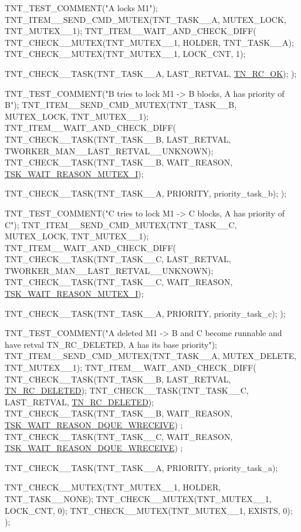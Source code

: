 \begin{DoxyCode}
TNT\_TEST\_COMMENT(\textcolor{stringliteral}{"A locks M1"});
TNT\_ITEM\_\_SEND\_CMD\_MUTEX(TNT\_TASK\_\_A, MUTEX\_LOCK, TNT\_MUTEX\_\_1);
TNT\_ITEM\_\_WAIT\_AND\_CHECK\_DIFF(
      TNT\_CHECK\_\_MUTEX(TNT\_MUTEX\_\_1, HOLDER, TNT\_TASK\_\_A);
      TNT\_CHECK\_\_MUTEX(TNT\_MUTEX\_\_1, LOCK\_CNT, 1);

      TNT\_CHECK\_\_TASK(TNT\_TASK\_\_A, LAST\_RETVAL, \hyperlink{tn__common_8h_aa43bd3da1ad4c1e61224b5f23b369876afb291924237186f5765865256c75e639}{TN\_RC\_OK});
      );

TNT\_TEST\_COMMENT(\textcolor{stringliteral}{"B tries to lock M1 -> B blocks, A has priority of B"});
TNT\_ITEM\_\_SEND\_CMD\_MUTEX(TNT\_TASK\_\_B, MUTEX\_LOCK, TNT\_MUTEX\_\_1);
TNT\_ITEM\_\_WAIT\_AND\_CHECK\_DIFF(
      TNT\_CHECK\_\_TASK(TNT\_TASK\_\_B, LAST\_RETVAL, TWORKER\_MAN\_\_LAST\_RETVAL\_\_UNKNOWN);
      TNT\_CHECK\_\_TASK(TNT\_TASK\_\_B, WAIT\_REASON, \hyperlink{tn__oldsymbols_8h_a1d72794d5d13225327301cce148c4676}{TSK\_WAIT\_REASON\_MUTEX\_I});

      TNT\_CHECK\_\_TASK(TNT\_TASK\_\_A, PRIORITY, priority\_task\_b);
      );

TNT\_TEST\_COMMENT(\textcolor{stringliteral}{"C tries to lock M1 -> C blocks, A has priority of C"});
TNT\_ITEM\_\_SEND\_CMD\_MUTEX(TNT\_TASK\_\_C, MUTEX\_LOCK, TNT\_MUTEX\_\_1);
TNT\_ITEM\_\_WAIT\_AND\_CHECK\_DIFF(
      TNT\_CHECK\_\_TASK(TNT\_TASK\_\_C, LAST\_RETVAL, TWORKER\_MAN\_\_LAST\_RETVAL\_\_UNKNOWN);
      TNT\_CHECK\_\_TASK(TNT\_TASK\_\_C, WAIT\_REASON, \hyperlink{tn__oldsymbols_8h_a1d72794d5d13225327301cce148c4676}{TSK\_WAIT\_REASON\_MUTEX\_I});

      TNT\_CHECK\_\_TASK(TNT\_TASK\_\_A, PRIORITY, priority\_task\_c);
      );

TNT\_TEST\_COMMENT(\textcolor{stringliteral}{"A deleted M1 -> B and C become runnable and have retval TN\_RC\_DELETED, A has its base
       priority"});
TNT\_ITEM\_\_SEND\_CMD\_MUTEX(TNT\_TASK\_\_A, MUTEX\_DELETE, TNT\_MUTEX\_\_1);
TNT\_ITEM\_\_WAIT\_AND\_CHECK\_DIFF(
      TNT\_CHECK\_\_TASK(TNT\_TASK\_\_B, LAST\_RETVAL, \hyperlink{tn__common_8h_aa43bd3da1ad4c1e61224b5f23b369876a3252967d2fdefcfbd4eb720ed4663d84}{TN\_RC\_DELETED});
      TNT\_CHECK\_\_TASK(TNT\_TASK\_\_C, LAST\_RETVAL, \hyperlink{tn__common_8h_aa43bd3da1ad4c1e61224b5f23b369876a3252967d2fdefcfbd4eb720ed4663d84}{TN\_RC\_DELETED});
      TNT\_CHECK\_\_TASK(TNT\_TASK\_\_B, WAIT\_REASON, \hyperlink{tn__oldsymbols_8h_a56aeec64ffd044ed5fb917eb415ea889}{TSK\_WAIT\_REASON\_DQUE\_WRECEIVE})
      ;
      TNT\_CHECK\_\_TASK(TNT\_TASK\_\_C, WAIT\_REASON, \hyperlink{tn__oldsymbols_8h_a56aeec64ffd044ed5fb917eb415ea889}{TSK\_WAIT\_REASON\_DQUE\_WRECEIVE})
      ;

      TNT\_CHECK\_\_TASK(TNT\_TASK\_\_A, PRIORITY, priority\_task\_a);

      TNT\_CHECK\_\_MUTEX(TNT\_MUTEX\_\_1, HOLDER, TNT\_TASK\_\_NONE);
      TNT\_CHECK\_\_MUTEX(TNT\_MUTEX\_\_1, LOCK\_CNT, 0);
      TNT\_CHECK\_\_MUTEX(TNT\_MUTEX\_\_1, EXISTS, 0);
      );
\end{DoxyCode}


